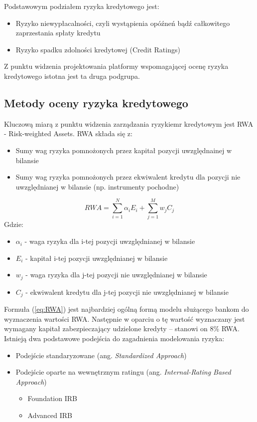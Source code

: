 Podstawowym podziałem ryzyka kredytowego jest:
\begin{itemize}
\item Ryzyko niewypłacalności, czyli wystąpienia opóźneń bądź całkowitego zaprzestania spłaty kredytu
\item Ryzyko spadku zdolności kredytowej (Credit Ratings)
\end{itemize}

Z punktu widzenia projektowania platformy wspomagającej ocenę ryzyka kredytowego istotna jest ta druga podgrupa.

\subsection{Metody oceny ryzyka kredytowego}

Kluczową miarą z punktu widzenia zarządzania ryzykiemr kredytowym jest RWA - Risk-weighted Assets. RWA składa się z:

\begin{itemize}
\item Sumy wag ryzyka pomnożonych przez kapitał pozycji uwzględnainej w bilansie
\item Sumy wag ryzyka pomnożonych przez
ekwiwalent kredytu dla pozycji nie uwzględnianej w bilansie (np. instrumenty pochodne)
\end{itemize}

\begin{equation} \label{eq:RWA}
RWA = \sum_{i=1}^{N}\alpha_{i}E_{i} + \sum_{j=1}^{M}w_{j}C_{j}
\end{equation}
Gdzie:
\begin{itemize}
	\item $\alpha_{i}$ - waga ryzyka dla i-tej pozycji uwzględnianej w bilansie
	\item $E_{i}$ - kapitał i-tej pozycji uwzględnianej w bilansie
	\item $w_{j}$ - waga ryzyka dla j-tej pozycji nie uwzględnianej w bilansie
	\item $C_{j}$ - ekwiwalent kredytu dla j-tej pozycji nie uwzględnianej w bilansie
\end{itemize}

Formuła (\ref{eq:RWA}) jest najbardziej ogólną formą modelu służącego bankom do wyznaczenia wartości RWA. Następnie w oparciu o tę wartość wyznaczany jest wymagany kapitał zabezpieczający udzielone kredyty – stanowi on 8\% RWA. Istnieją dwa podstawowe podejścia do zagadnienia modelowania ryzyka:

\begin{itemize}
\item Podejście standaryzowane (ang. \textit{Standardized Approach})
\item Podejście oparte na wewnętrznym ratingu (ang. \textit{Internal-Rating Based Approach})
	\begin{itemize}
	\item Foundation IRB
	\item Advanced IRB
	\end{itemize}
\end{itemize}

